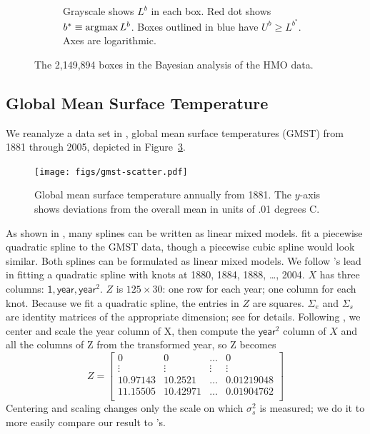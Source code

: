 \documentclass[ejs]{imsart}
\newcommand{\textcompute}{\textsf}
\newcommand{\sigssq}{\sigma_s^2}
\newcommand{\argmax}{\operatornamewithlimits{argmax}}
\begin{document}
\begin{figure}
\begin{subfigure}{.5\textwidth}
	\caption{Grayscale shows $L^b$ in each box.  Red dot shows $b^* \equiv\argmax L^b$.
	Boxes outlined in blue have $U^b \ge L^{b^*}$.  Axes are logarithmic.}
	\label{fig:hmoBayesrll}
  \end{subfigure}
  \caption{The 2,149,894 boxes in the Bayesian analysis of the HMO data.}
  \label{fig:hmoBayes}
\end{figure}

\subsection{Global Mean Surface Temperature}
We reanalyze a data set in \cite{hodges:2013}, global mean surface temperatures (GMST) from 1881 through 2005, depicted in Figure~\ref{fig:gmst-scatter}.  
\begin{figure}
	\centering
	\texttt{[image: figs/gmst-scatter.pdf]}
	\caption{Global mean surface temperature annually from 1881.
		The $y$-axis shows deviations from the overall mean in units of
		.01 degrees C.}
	\label{fig:gmst-scatter}
\end{figure}
As shown in \cite{ruppert_etal:2003}, many splines can be written as linear mixed models.  \cite{hodges:2013} fit a piecewise quadratic spline to the GMST data, though a piecewise cubic spline would look similar.  Both splines can be formulated as linear mixed models.  We follow \cite{hodges:2013}'s lead in fitting a quadratic spline with knots at 1880, 1884, 1888, \dots, 2004.  $X$ has three columns: $\textcompute{1}, \textcompute{year}, \textcompute{year}^2$.  $Z$ is $125 \times 30$: one row for each year; one column for each knot.
Because we fit a quadratic spline, the entries in $Z$ are squares.  $\Sigma_e$ and $\Sigma_s$ are identity matrices of the appropriate dimension; see \cite{hodges:2013} for details.  Following \cite{hodges:2013}, we center and scale the \textcompute{year} column of X, then compute the $\textcompute{year}^2$ column of $X$ and all the columns of Z from the transformed \textcompute{year}, so Z becomes
\begin{equation*}
Z =	\begin{bmatrix} 
		0 & 0 & \dots & 0\\
		\vdots & \vdots & \vdots & \vdots\\
		10.97143 & 10.2521 & \dots & 0.01219048\\
		11.15505 & 10.42971 & \dots & 0.01904762\\
	\end{bmatrix}
\end{equation*}
Centering and scaling changes only the scale on which $\sigssq$ is measured; we do it to more easily compare our result to \cite{hodges:2013}'s.
\end{document}
